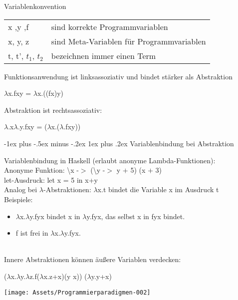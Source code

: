 \documentclass[10pt]{article}
\makeatletter
\renewcommand{\subsubsection}{\@startsection{subsubsection}{3}{0mm}%
                                {-1ex plus -.5ex minus -.2ex}%
                                {1ex plus .2ex}%
                                {\normalfont\small\bfseries}}
\makeatother
\begin{document}
Variablenkonvention
\begin{tabular}[h]{ll}
  x ,y ,f             & \enspace \enspace sind korrekte Programmvariablen           \\
  x, y, z             & \enspace \enspace sind Meta-Variablen für Programmvariablen \\
  t, t', $t_1$, $t_2$ & \enspace  \enspace bezeichnen immer einen Term
  
\end{tabular}

Funktionsanwendung ist linksassoziativ und bindet stärker als Abstraktion

\begin{center}
  $\lambda$x.fxy = $\lambda$x.((fx)y)
\end{center}
Abstraktion ist rechtsassoziativ: 

\begin{center}
  $\lambda$.x$\lambda$.y.fxy = ($\lambda$x.($\lambda$.fxy))
\end{center}

\subsubsection{Variablenbindung bei Abstraktion}

Variablenbindung in Haskell (erlaubt anonyme Lambda-Funktionen): \\
\color{blue}Anonyme Funktion: \color{black} \textbackslash x -$>$ (\textbackslash y -$>$ y $+$ 5) (x $+$ 3)\\
\color{blue} let-Ausdruck: \color{black} let x = 5 in x+y\\

Analog bei $\lambda$-Abstraktionen: $\lambda$x.t bindet die Variable x im Ausdruck t\\
Beispiele: 
\begin{itemize}
  \item $\lambda$x.$\lambda$y.fyx bindet x in $\lambda$y.fyx, das selbst x in fyx bindet.
  \item f ist frei in $\lambda$x.$\lambda$y.fyx.
\end{itemize}
\ \\
Innere Abstraktionen können äußere Variablen verdecken: \ \\
\begin{center}
  ($\lambda$x.$\lambda$y.$\lambda$z.f($\lambda$x.z+x)(y x)) ($\lambda$y.y+x)
\end{center}
\begin{center}
  \texttt{[image: Assets/Programmierparadigmen-002]}
\end{center}
\end{document}
